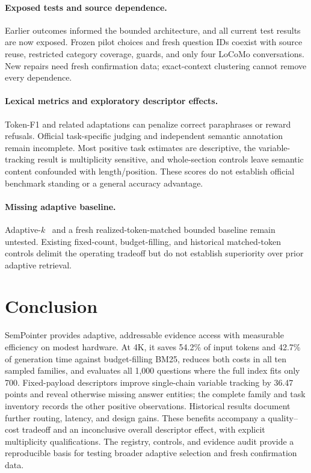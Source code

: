 \documentclass[runningheads]{llncs}
\begin{document}
\paragraph{Exposed tests and source dependence.}
Earlier outcomes informed the bounded architecture, and all current test results are now exposed. Frozen pilot choices and fresh question IDs coexist with source reuse, restricted category coverage, guards, and only four LoCoMo conversations. New repairs need fresh confirmation data; exact-context clustering cannot remove every dependence.

\paragraph{Lexical metrics and exploratory descriptor effects.}
Token-F1 and related adaptations can penalize correct paraphrases or reward refusals. Official task-specific judging and independent semantic annotation remain incomplete. Most positive task estimates are descriptive, the variable-tracking result is multiplicity sensitive, and whole-section controls leave semantic content confounded with length/position. These scores do not establish official benchmark standing or a general accuracy advantage.

\paragraph{Missing adaptive baseline.}
Adaptive-$k$~\cite{taguchi2025adaptivek} and a fresh realized-token-matched bounded baseline remain untested. Existing fixed-count, budget-filling, and historical matched-token controls delimit the operating tradeoff but do not establish superiority over prior adaptive retrieval.

\section{Conclusion}
SemPointer provides adaptive, addressable evidence access with measurable efficiency on modest hardware. At 4K, it saves 54.2\% of input tokens and 42.7\% of generation time against budget-filling BM25, reduces both costs in all ten sampled families, and evaluates all 1,000 questions where the full index fits only 700. Fixed-payload descriptors improve single-chain variable tracking by 36.47 points and reveal otherwise missing answer entities; the complete family and task inventory records the other positive observations. Historical results document further routing, latency, and design gains. These benefits accompany a quality--cost tradeoff and an inconclusive overall descriptor effect, with explicit multiplicity qualifications. The registry, controls, and evidence audit provide a reproducible basis for testing broader adaptive selection and fresh confirmation data.
\end{document}
